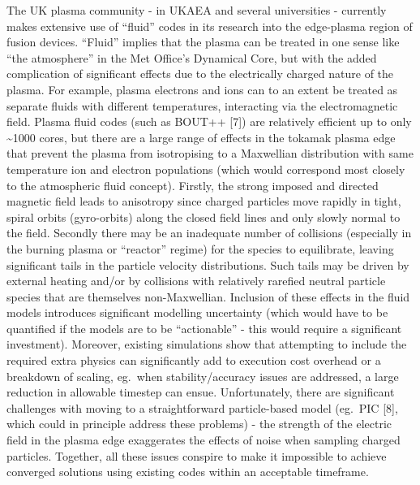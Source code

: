 The UK plasma community - in UKAEA and several universities - currently makes extensive 
use of ``fluid'' codes in its research into the edge-plasma region of fusion devices. 
``Fluid'' implies that the plasma can be treated in one sense like ``the atmosphere'' 
in the Met Office's Dynamical Core, but with the added complication of significant 
effects due to the electrically charged nature of the plasma. For example, plasma 
electrons and ions can to an extent be treated as separate fluids with different 
temperatures, interacting via the electromagnetic field. Plasma fluid codes (such 
as  BOUT++ [7]) are relatively efficient up to only \textasciitilde{}1000 
cores, but there are a large range of effects in the tokamak plasma edge that prevent 
the plasma from isotropising to a Maxwellian distribution with same temperature 
ion and electron populations (which would correspond most closely to the atmospheric 
fluid concept). Firstly, the strong imposed and directed magnetic field leads to 
anisotropy since charged particles move rapidly in tight, spiral orbits (gyro-orbits) 
along the closed field lines and only slowly normal to the field. Secondly there 
may be an inadequate number of collisions (especially in the burning plasma or 
``reactor'' regime) for the species to equilibrate, leaving significant tails in 
the particle velocity distributions. Such tails may be driven by external heating 
and/or by collisions with relatively rarefied neutral particle species that are 
themselves non-Maxwellian. Inclusion of these effects in the fluid models introduces 
significant modelling uncertainty (which would have to be quantified if the models 
are to be ``actionable'' - this would require a significant investment). Moreover, 
existing simulations show that attempting to include the required extra physics 
can significantly add to execution cost overhead or a breakdown of scaling, eg.\ 
when stability/accuracy issues are addressed, a large reduction in allowable timestep 
can ensue. Unfortunately, there are significant challenges with moving to a straightforward 
particle-based  model (eg.\ PIC [8], which could in principle 
address these problems) - the strength of the electric field in the plasma edge 
exaggerates the effects of noise when sampling charged particles. Together, all 
these issues conspire to make it impossible to achieve converged solutions using 
existing codes within an acceptable timeframe.

